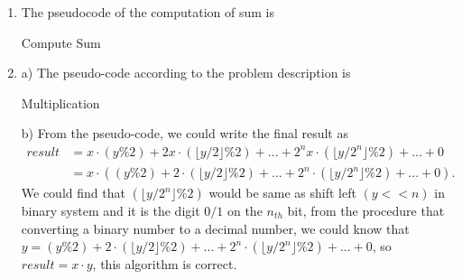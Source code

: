 \documentclass{assignment}
\begin{document}
    \begin{homeworkProblem}
    \begin{enumerate}
    \item The pseudocode of the computation of sum is  
     \begin{algorithm}[]
     \BlankLine
{}
\caption{Compute Sum} \end{algorithm}


\item  a) The pseudo-code according to the problem description is  
    \begin{algorithm}[h!]
    \BlankLine
{}
\caption{Multiplication} 
\end{algorithm}
\newpage
b) From the pseudo-code, we could write the final result as 
	\begin{equation*}
	\begin{aligned}
	result &= x\cdot (y \% 2) + 2x\cdot  (\lfloor y/2 \rfloor \% 2) + ... + 2^n x\cdot (\lfloor y/2^n \rfloor \% 2) + ... + 0 \\
	&= x \cdot \left( (y \% 2) + 2 \cdot (\lfloor y/2 \rfloor \% 2) + ... +  2^n \cdot (\lfloor y/2^n \rfloor \% 2) + ... + 0\right).
	\end{aligned}
	\end{equation*}
We could find that $(\lfloor y/2^n \rfloor \% 2)$ would be same as shift left $(y << n)$ in binary system and it is the digit $0/1$ on the $n_{th}$ bit, from the procedure that converting a binary number to a decimal number, 
we could know that $y = (y \% 2) + 2 \cdot (\lfloor y/2 \rfloor \% 2) + ... +  2^n \cdot (\lfloor y/2^n \rfloor \% 2) + ... + 0$, so $result = x \cdot y$, this algorithm is correct.


    \end{enumerate}
    \end{homeworkProblem}
    
\end{document}
